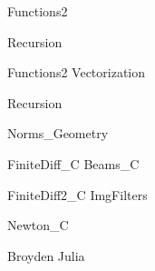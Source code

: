 \documentclass{newsiambook}
\begin{document}

\begin{python}
{Functions2}
%
%

{Recursion}
%

\end{python}

\begin{matlab}
{Functions2}
{Vectorization}
%
%

{Recursion}
%
%
\end{matlab}

{Norms_Geometry}


{FiniteDiff_C}
{Beams_C}
%
%

{FiniteDiff2_C}
{ImgFilters}
%
%

{Newton_C}
%

{Broyden}
{Julia}
\end{document}
